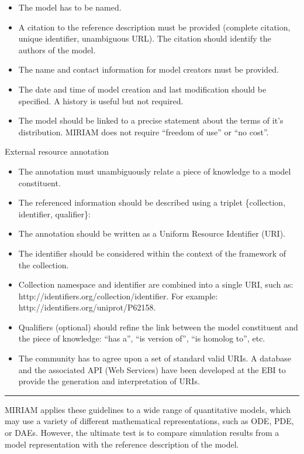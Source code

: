 \begin{itemize}
\item
  The model has to be named.
\item
  A citation to the reference description must be provided (complete
  citation, unique identifier, unambiguous URL). The citation should
  identify the authors of the model.
\item
  The name and contact information for model creators must be provided.
\item
  The date and time of model creation and last modification should be
  specified. A history is useful but not required.
\item
  The model should be linked to a precise statement about the terms of
  it's distribution. MIRIAM does not require ``freedom of use'' or ``no
  cost''.
\end{itemize}
External resource annotation

\begin{itemize}
\item
  The annotation must unambiguously relate a piece of knowledge to a
  model constituent.
\item
  The referenced information should be described using a triplet
  \{collection, identifier, qualifier\}:
\item
  The annotation should be written as a Uniform Resource Identifier
  (URI).
\item
  The identifier should be considered within the context of the
  framework of the collection.
\item
  Collection namespace and identifier are combined into a single URI,
  such as: http://identifiers.org/collection/identifier. For example:
  http://identifiers.org/uniprot/P62158.
\item
  Qualifiers (optional) should refine the link between the model
  constituent and the piece of knowledge: ``has a'', ``is version of'',
  ``is homolog to'', etc.
\item
  The community has to agree upon a set of standard valid URIs. A
  database and the associated API (Web Services) have been developed at
  the EBI to provide the generation and interpretation of URIs.
\end{itemize}
\begin{center}\rule{3in}{0.4pt}\end{center}

MIRIAM applies these guidelines to a wide range of quantitative models,
which may use a variety of different mathematical representations, such
as ODE, PDE, or DAEs. However, the ultimate test is to compare
simulation results from a model representation with the reference
description of the model.

